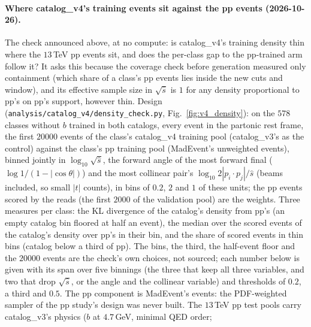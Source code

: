\documentclass[11pt]{article}
\newcommand{\code}[1]{\texttt{#1}}
\begin{document}
\paragraph{Where catalog\_v4's training events sit against the pp events (2026-10-26).}\label{par:v4_density} The check
announced above, at no compute: is catalog\_v4's training density thin where the $13$\,TeV pp events sit, and does the
per-class gap to the pp-trained arm follow it? It asks this because the coverage check before generation measured only
containment (which share of a class's pp events lies inside the new cuts and window), and its effective sample size in
$\sqrt{\hat s}$ is $1$ for any density proportional to pp's on pp's support, however thin. Design
(\code{analysis/catalog\_v4/density\_check.py}, Fig.~\ref{fig:v4_density}): on the $578$ classes without $b$ trained in
both catalogs, every event in the partonic rest frame, the first $20000$ events of the class's catalog\_v4 training pool
(catalog\_v3's as the control) against the class's pp training pool (MadEvent's unweighted events), binned jointly in
$\log_{10}\sqrt{\hat s}$, the forward angle of the most forward final ($\log 1/(1-|\cos\theta|)$) and the most
collinear pair's $\log_{10} 2|p_i\cdot p_j|/\hat s$ (beams included, so small $|t|$ counts), in bins of $0.2$, $2$ and
$1$ of these units; the pp events scored by the reads (the first $2000$ of the validation pool) are the weights. Three
measures per class: the KL divergence of the catalog's density from pp's (an empty catalog bin floored at half an
event), the median over the scored events of the catalog's density over pp's in their bin, and the share of scored
events in thin bins (catalog below a third of pp). The bins, the third, the half-event floor and the $20000$ events are
the check's own choices, not sourced; each number below is given with its span over five binnings (the three that keep
all three variables, and two that drop $\sqrt{\hat s}$, or the angle and the collinear variable) and thresholds of
$0.2$, a third and $0.5$. The pp component is MadEvent's events: the PDF-weighted sampler of the pp study's design was
never built. The $13$\,TeV pp test pools carry catalog\_v3's physics ($b$ at $4.7$\,GeV, minimal QED order;
\end{document}

